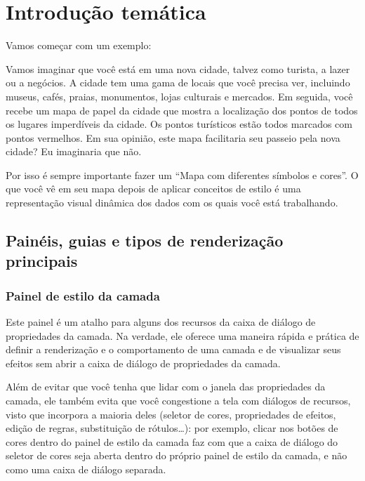 \documentclass[
]{book}
\begin{document}
\hypertarget{introduuxe7uxe3o-temuxe1tica-4}{%
\section{Introdução temática}\label{introduuxe7uxe3o-temuxe1tica-4}}

Vamos começar com um exemplo:

Vamos imaginar que você está em uma nova cidade, talvez como turista, a lazer ou a negócios. A cidade tem uma gama de locais que você precisa ver, incluindo museus, cafés, praias, monumentos, lojas culturais e mercados. Em seguida, você recebe um mapa de papel da cidade que mostra a localização dos pontos de todos os lugares imperdíveis da cidade. Os pontos turísticos estão todos marcados com pontos vermelhos. Em sua opinião, este mapa facilitaria seu passeio pela nova cidade? Eu imaginaria que não.

Por isso é sempre importante fazer um ``Mapa com diferentes símbolos e cores''. O que você vê em seu mapa depois de aplicar conceitos de estilo é uma representação visual dinâmica dos dados com os quais você está trabalhando.

\hypertarget{painuxe9is-guias-e-tipos-de-renderizauxe7uxe3o-principais}{%
\subsection{Painéis, guias e tipos de renderização principais}\label{painuxe9is-guias-e-tipos-de-renderizauxe7uxe3o-principais}}

\hypertarget{painel-de-estilo-da-camada}{%
\subsubsection{\texorpdfstring{\textbf{Painel de estilo da camada}}{Painel de estilo da camada}}\label{painel-de-estilo-da-camada}}

Este painel é um atalho para alguns dos recursos da caixa de diálogo de propriedades da camada. Na verdade, ele oferece uma maneira rápida e prática de definir a renderização e o comportamento de uma camada e de visualizar seus efeitos sem abrir a caixa de diálogo de propriedades da camada.

Além de evitar que você tenha que lidar com o janela das propriedades da camada, ele também evita que você congestione a tela com diálogos de recursos, visto que incorpora a maioria deles (seletor de cores, propriedades de efeitos, edição de regras, substituição de rótulos\ldots): por exemplo, clicar nos botões de cores dentro do painel de estilo da camada faz com que a caixa de diálogo do seletor de cores seja aberta dentro do próprio painel de estilo da camada, e não como uma caixa de diálogo separada.
\end{document}
